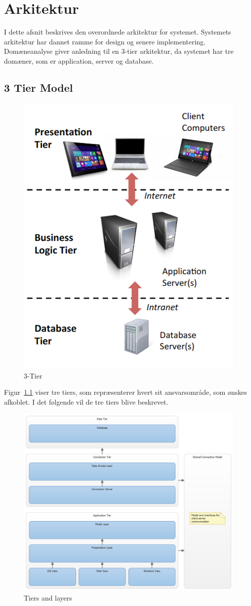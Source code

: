 \chapter{Arkitektur}
I dette afsnit beskrives den overordnede arkitektur for systemet. Systemets arkitektur har dannet ramme for design og senere implementering. Domæneanalyse giver anledning til en 3-tier arkitektur, da systemet har tre domæner, som er application, server og database.

\section{3 Tier Model}
\begin{figure}
	\centering
	\includegraphics[width=0.5\linewidth]{figs/arkitektur/3tier}
	\caption{ 3-Tier}
	\label{fig:3tier}
\end{figure}

Figur~\ref{fig:3tier} viser tre tiers, som repræsenterer hvert sit ansvarsområde, som ønskes afkoblet. I det følgende vil de tre tiers blive beskrevet.

\begin{figure}
	\centering
	\includegraphics[width=0.9\linewidth]{figs/arkitektur/Smartpool_tiersnlayers}
	\caption{Tiers and layers}
	\label{fig:tiersnlayers}
\end{figure}

